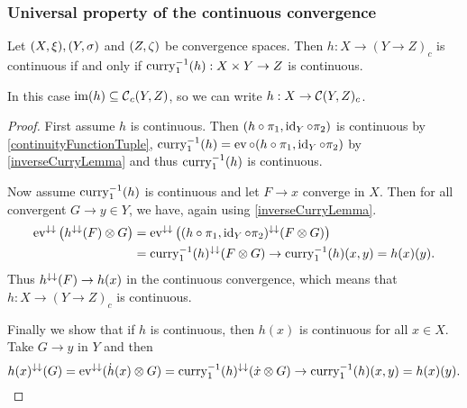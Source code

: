 \subsubsection{Universal property of the continuous convergence}
\begin{proposition} \label{universalPropertyContinuousConvergence}
Let $\sSet{X, \xi}, \sSet{Y,\sigma}$ and $\sSet{Z,\zeta}$ be convergence spaces. Then $h: X\to (Y \to Z)_c$ is continuous \textup{if and only if} $\operatorname{curry}_1^{-1}(h): X\times Y \to Z$ is continuous.

In this case $\operatorname{im}(h) \subseteq \operatorname{\mathcal{C}}_c(Y,Z)$, so we can write $h: X\to \operatorname{\mathcal{C}}(Y,Z)_c$.
\end{proposition}
\begin{proof}
First assume $h$ is continuous. Then $(h\circ \pi_1, \operatorname{id}_Y\circ \pi_2)$ is continuous by \ref{continuityFunctionTuple}, $\operatorname{curry}_1^{-1}(h) = \operatorname{ev} \circ (h\circ \pi_1, \operatorname{id}_Y\circ \pi_2)$ by \ref{inverseCurryLemma} and thus $\operatorname{curry}_1^{-1}(h)$ is continuous.

Now assume $\operatorname{curry}_1^{-1}(h)$ is continuous and let $F\to x$ converge in $X$. Then for all convergent $G\to y\in Y$, we have, again using \ref{inverseCurryLemma}.
\begin{align*}
\operatorname{ev}^{\downarrow\downarrow}\big(h^{\downarrow\downarrow}(F)\otimes G\big) &= \operatorname{ev}^{\downarrow\downarrow}\big((h\circ \pi_1, \operatorname{id}_Y\circ \pi_2)^{\downarrow\downarrow}(F\otimes G)\big) \\
&= \operatorname{curry}_1^{-1}(h)^{\downarrow\downarrow}(F\otimes G) \to \operatorname{curry}_1^{-1}(h)(x,y) = h(x)(y).
\end{align*}
Thus $h^{\downarrow\downarrow}(F) \to h(x)$ in the continuous convergence, which means that $h: X\to (Y \to Z)_c$ is continuous.

Finally we show that if $h$ is continuous, then $h(x)$ is continuous for all $x\in X$. Take $G\to y$ in $Y$ and then
\[ h(x)^{\downarrow\downarrow}(G) = \operatorname{ev}^{\downarrow\downarrow}(\dot{h}(x)\otimes G) = \operatorname{curry}_1^{-1}(h)^{\downarrow\downarrow}(\dot{x}\otimes G) \to \operatorname{curry}_1^{-1}(h)(x,y) = h(x)(y). \]
\end{proof}

